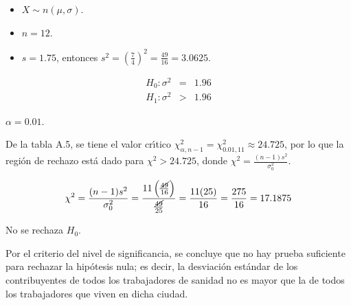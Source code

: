 \begin{solucion}
 \begin{datos}
  $\phantom{0}$
  \begin{itemize}
   \item $X \sim n\left( \mu, \sigma \right)$.
   \item $n = 12$.
   \item $s = 1.75$,
   entonces $s^2 = \left(\frac{7}{4}\right)^2 = \frac{49}{16} = 3.0625$.
  \end{itemize}
 \end{datos}

 \begin{hipotesis}
  \begin{eqnarray*}
   H_0: \sigma^2 & = & 1.96 \\
   H_1: \sigma^2 & > & 1.96
  \end{eqnarray*}
 \end{hipotesis}

 \begin{significancia}
  $\alpha = 0.01$.
 \end{significancia}

 \begin{region}
  De la tabla A.5, se tiene el valor cr\'{\i}tico
  $\chi^2_{\alpha,n-1}=\chi^2_{0.01,11} \approx 24.725$,
  por lo que la regi\'on de rechazo est\'a dado para $\chi^2 > 24.725$,
  donde $\chi^2 = \frac{(n-1)s^2}{\sigma_0^2}$.
 \end{region}

 \begin{estadistico}
  \begin{equation*}
   \chi^2 = \frac{(n-1)s^2}{\sigma_0^2}
   = \frac{11\left(\frac{\cancel{49}}{16}\right)}{\frac{\cancel{49}}{25}}
   = \frac{11(25)}{16} = \frac{275}{16} = 17.1875
  \end{equation*}
 \end{estadistico}

 \begin{decision}
  No se rechaza $H_0$.
 \end{decision}

 \begin{conclusion}
  Por el criterio del nivel de significancia, se concluye
  que no hay prueba suficiente para rechazar la hip\'otesis nula;
  es decir, la desviaci\'on est\'andar de los contribuyentes de todos
  los trabajadores de sanidad no es mayor que la de todos los trabajadores
  que viven en dicha ciudad.
 \end{conclusion}
 

\end{solucion}
